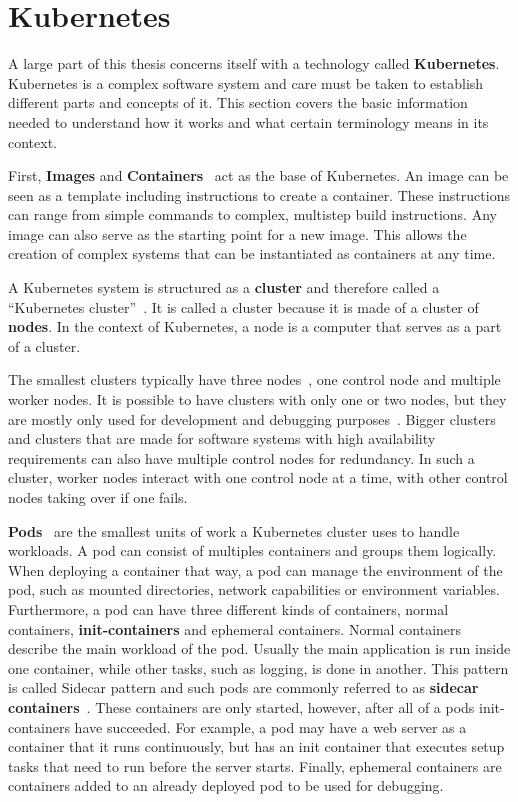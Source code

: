\section{Kubernetes}\label{sec:kubernetes}

A large part of this thesis concerns itself with a technology called \textbf{Kubernetes}.
Kubernetes is a complex software system and care must be taken to establish different parts and concepts of it.
This section covers the basic information needed to understand how it works and what certain terminology means in its context.

First, \textbf{Images} and \textbf{Containers}~\cite{docker-image,kubernetes-images,kubernetes-containers} act as the base of Kubernetes.
An image can be seen as a template including instructions to create a container.
These instructions can range from simple commands to complex, multistep build instructions.
Any image can also serve as the starting point for a new image.
This allows the creation of complex systems that can be instantiated as containers at any time.

A Kubernetes system is structured as a \textbf{cluster} and therefore called a ``Kubernetes cluster''~\cite{kubernetes-cluster}.
It is called a cluster because it is made of a cluster of \textbf{nodes}.
In the context of Kubernetes, a node is a computer that serves as a part of a cluster.

The smallest clusters typically have three nodes~\cite{kubernetes-cluster}, one control node and multiple worker nodes.
It is possible to have clusters with only one or two nodes, but they are mostly only used for development and debugging purposes~\cite{minikube}.
Bigger clusters and clusters that are made for software systems with high availability requirements can also have multiple control nodes for redundancy.
In such a cluster, worker nodes interact with one control node at a time, with other control nodes taking over if one fails.

\pagebreak

\textbf{Pods}~\cite{kubernetes-pods} are the smallest units of work a Kubernetes cluster uses to handle workloads.
A pod can consist of multiples containers and groups them logically.
When deploying a container that way, a pod can manage the environment of the pod, such as mounted directories, network capabilities or environment variables.
Furthermore, a pod can have three different kinds of containers, normal containers, \textbf{init-containers} and ephemeral containers.
Normal containers describe the main workload of the pod.
Usually the main application is run inside one container, while other tasks, such as logging, is done in another.
This pattern is called Sidecar pattern and such pods are commonly referred to as \textbf{sidecar containers}~\cite{sidecar-container}.
These containers are only started, however, after all of a pods init-containers have succeeded.
For example, a pod may have a web server as a container that it runs continuously, but has an init container that executes setup tasks that need to run before the server starts.
Finally, ephemeral containers are containers added to an already deployed pod to be used for debugging.

